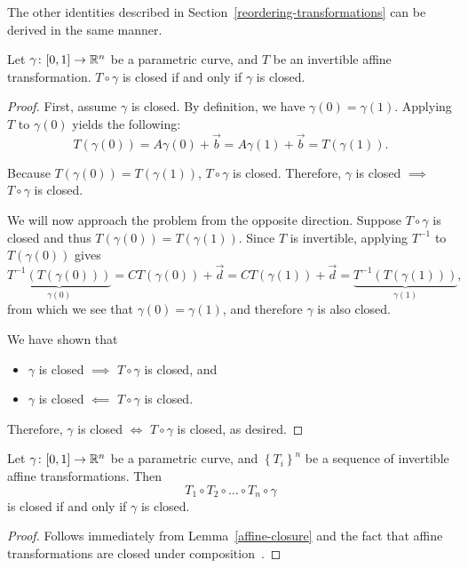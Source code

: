 The other identities described in Section~\ref{reordering-transformations} can be derived in the same manner.

\begin{lemma}\label{affine-closure}
    Let $\gamma \colon \interval[scaled]{0}{1} \to \mathbb{R}^n$ be a parametric curve, and $T$ be an invertible affine transformation. $T \circ \gamma$ is closed if and only if $\gamma$ is closed.
\end{lemma}

\begin{proof}
    First, assume $\gamma$ is closed. By definition, we have $\gamma(0) = \gamma(1)$. Applying $T$ to $\gamma(0)$ yields the following: 
    \[     
        T\left(\gamma(0)\right) = A\gamma(0) + \vec{b} = A\gamma(1) + \vec{b} = T\left(\gamma(1)\right)\text{.}
    \]
    
    Because $T\left(\gamma(0)\right) = T\left(\gamma(1)\right)$, $T \circ \gamma$ is closed. Therefore, $\gamma$ is closed $\implies$ $T \circ \gamma$ is closed. 
    
    We will now approach the problem from the opposite direction. Suppose $T \circ \gamma$ is closed and thus $T\left(\gamma(0)\right) = T\left(\gamma(1)\right)$. Since $T$ is invertible, applying $T^{-1}$ to $T(\gamma(0))$ gives
    \[
        \underbrace{T^{-1}\left(T\left(\gamma(0)\right)\right)}_{\gamma(0)} = CT\left(\gamma(0)\right) + \vec{d} = CT\left(\gamma(1)\right) + \vec{d} = \underbrace{T^{-1}\left(T\left(\gamma(1)\right)\right)}_{\gamma(1)}\text{,}
    \]
    from which we see that $\gamma(0) = \gamma(1)$, and therefore $\gamma$ is also closed. 
    
    We have shown that
    \begin{itemize}
        \item $\gamma$ is closed $\implies$ $T \circ \gamma$ is closed, and
        \item $\gamma$ is closed $\impliedby$ $T \circ \gamma$ is closed.
    \end{itemize}
    Therefore, $\gamma$ is closed $\iff$ $T \circ \gamma$ is closed, as desired.
\end{proof}

\begin{theorem}\label{closed-path-composition}
    Let $\gamma \colon \interval[scaled]{0}{1} \to \mathbb{R}^n$ be a parametric curve, and $\left\{T_i\right\}^n$ be a sequence of invertible affine transformations. Then
    \[
        T_1 \circ T_2 \circ \ldots \circ T_n \circ \gamma
    \]
    is closed if and only if $\gamma$ is closed.
\end{theorem}

\begin{proof}
    Follows immediately from Lemma~\ref{affine-closure} and the fact that affine transformations are closed under composition~\cite[p.~34]{szeliski2022cv}.
\end{proof}
